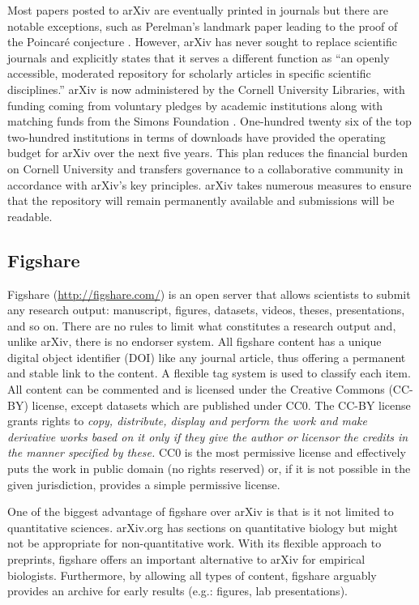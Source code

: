 \documentclass[letterpaper,twocolumn,superscriptaddress,showkeys]{revtex4-1}
\begin{document}
Most papers posted to arXiv are eventually printed in journals but there are
notable exceptions, such as Perelman's landmark paper leading to the proof of
the Poincar\'{e} conjecture \cite{2002math.....11159P}.  However, arXiv has
never sought to replace scientific journals and explicitly states that it serves
a different function as ``an openly accessible, moderated repository for
scholarly articles in specific scientific disciplines.'' arXiv is now
administered by the Cornell University Libraries, with funding coming from
voluntary pledges by academic institutions along with matching funds from the
Simons Foundation \cite{arxiv_future}.  One-hundred twenty six of the top
two-hundred institutions in terms of downloads have provided the operating
budget for arXiv over the next five years.  This plan reduces the financial
burden on Cornell University and transfers governance to a collaborative
community in accordance with arXiv's key principles.  arXiv takes numerous
measures to ensure that the repository will remain permanently available and
submissions will be readable.

\subsection{Figshare}

Figshare (\href{http://figshare.com/}{http://figshare.com/}) is an open server
that allows scientists to submit any research output: manuscript, figures,
datasets, videos, theses, presentations, and so on. There are no rules to limit
what constitutes a research output and, unlike arXiv, there is no endorser
system. All figshare content has a unique digital object identifier (DOI) like
any journal article, thus offering a permanent and stable link to the content.
A flexible tag system is used to classify each item. All content can be
commented and is licensed under the Creative Commons (CC-BY) license, except
datasets which are published under CC0. The CC-BY license grants rights to
\emph{copy, distribute, display and perform the work and make derivative works
based on it only if they give the author or licensor the credits in the manner
specified by these.}  CC0 is the most permissive license and effectively puts
the work in public domain (no rights reserved) or, if it is not possible in the
given jurisdiction, provides a simple permissive license.

One of the biggest advantage of figshare over arXiv is that is it not limited to
quantitative sciences. arXiv.org has sections on quantitative biology but might
not be appropriate for non-quantitative work. With its flexible approach to
preprints, figshare offers an important alternative to arXiv for empirical
biologists. Furthermore, by allowing all types of content, figshare arguably
provides an archive for early results (e.g.: figures, lab presentations).
\end{document}
